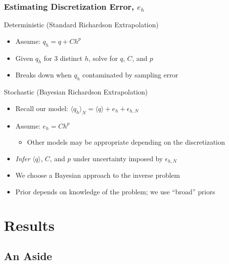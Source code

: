 \documentclass[mathserif]{beamer}
\newcommand{\avg}[1]{\langle #1 \rangle} %
\begin{document}
\begin{frame}
\frametitle{Estimating Discretization Error, $e_h$}

\begin{block}{Deterministic (Standard Richardson Extrapolation)}
\begin{itemize}
\item Assume: $q_h = q + C h^p$
\item Given $q_h$ for 3 distinct $h$, solve for $q$, $C$, and $p$
\item Breaks down when $q_h$ contaminated by sampling error
\end{itemize}
\end{block}

\begin{block}{Stochastic (Bayesian Richardson Extrapolation)}
\begin{itemize}
\item Recall our model: $\langle q_h \rangle_{N} = \langle q \rangle + e_h + \epsilon_{h,N}$
\item Assume: $e_h = C h^p$
  \begin{itemize}
  \item Other models may be appropriate depending on the discretization
  \end{itemize}
 \item \emph{Infer} $\langle q \rangle$, $C$, and $p$ under uncertainty imposed by
      $\epsilon_{h,N}$
 \item We choose a Bayesian approach to the inverse problem
 \item Prior depends on knowledge of the problem; we use ``broad'' priors
\end{itemize}
\end{block}

\end{frame}

\section{Results}

\subsection{An Aside}
\end{document}
